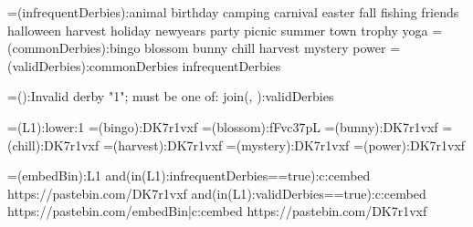 {=(infrequentDerbies):animal birthday camping carnival easter fall fishing friends halloween harvest holiday newyears party picnic summer town trophy yoga}
{=(commonDerbies):bingo blossom bunny chill harvest mystery power}
{=(validDerbies):{commonDerbies} {infrequentDerbies}}

{=():Invalid derby "{1}"; must be one of: {join(, ):{validDerbies}}}

{=(L1):{lower:{1}}}
{=(bingo):DK7r1vxf}
{=(blossom):fFvc37pL}
{=(bunny):DK7r1vxf}
{=(chill):DK7r1vxf}
{=(harvest):DK7r1vxf}
{=(mystery):DK7r1vxf}
{=(power):DK7r1vxf}


{=(embedBin):{{L1}}}
{{and({in({L1}):{infrequentDerbies}}==true):c:cembed https://pastebin.com/DK7r1vxf}}
{{and({in({L1}):{validDerbies}}==true):c:cembed https://pastebin.com/{embedBin}}|c:cembed https://pastebin.com/DK7r1vxf}